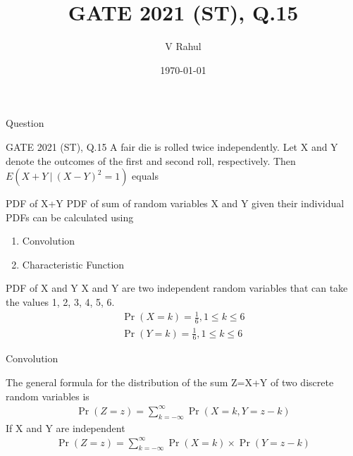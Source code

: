 \documentclass{beamer}
\title{GATE 2021 (ST), Q.15}
\author{V Rahul}
\institute{IITH}
\date{\today}
\providecommand{\brak}[1]{\ensuremath{\left(#1\right)}}
\begin{document}
\begin{frame}
  \titlepage
\end{frame}
\begin{frame}{Question}
    \begin{block}{GATE 2021 (ST), Q.15}
        A fair die is rolled twice independently. Let X and Y denote the outcomes of the first and second roll, respectively. Then $E(X+Y\:|\:(X-Y)^2=1)$ equals
    \end{block}
\end{frame}
\begin{frame}{PDF of X+Y}
    PDF of sum of random variables X and Y given their individual PDFs can be calculated using
    \begin{enumerate}
        \item Convolution
        \item Characteristic Function
    \end{enumerate}
\end{frame}
\begin{frame}{PDF of X and Y}
    X and Y are two independent random variables that can take the values 1, 2, 3, 4, 5, 6.
    \begin{align}
        \Pr\brak{X=k}=\frac{1}{6}, 1\leq k \leq 6\\
        \Pr\brak{Y=k}=\frac{1}{6}, 1\leq k \leq 6
    \end{align}
\end{frame}
\begin{frame}{Convolution}
    \begin{block}{}
        The general formula for the distribution of the sum Z=X+Y of two discrete random variables is\\
        \begin{align}
            \Pr\brak{Z=z} = \sum_{k=-\infty}^{\infty} \Pr\brak{X=k,Y=z-k}
        \end{align}
        If X and Y are independent\\
        \begin{align}
            \Pr\brak{Z=z} = \sum_{k=-\infty}^{\infty} \Pr\brak{X=k}\times\Pr\brak{Y=z-k}
        \end{align}
    \end{block}
\end{frame}
\end{document}
